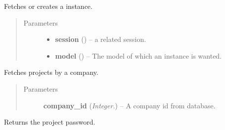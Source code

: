 \documentclass[letterpaper,10pt,english]{sphinxmanual}
\begin{document}
\begin{fulllineitems}
\label{controller:controller.GetOrCreate}
Fetches or creates a instance.
\begin{quote}\begin{description}
\item[{Parameters}] \leavevmode\begin{itemize}
\item {} 
\textbf{session} ({\hyperref[models:models.Session]{}}) -- a related session.

\item {} 
\textbf{model} () -- The model of which an instance is wanted.

\end{itemize}

\end{description}\end{quote}

\end{fulllineitems}


\begin{fulllineitems}
\label{controller:controller.GetProject}
Fetches projects by a company.
\begin{quote}\begin{description}
\item[{Parameters}] \leavevmode
\textbf{company\_id} (\emph{Integer.}) -- A company id from database.

\end{description}\end{quote}

\end{fulllineitems}


\begin{fulllineitems}
\label{controller:controller.GetProjectPassword}
Returns the project password.

\end{fulllineitems}

\end{document}
